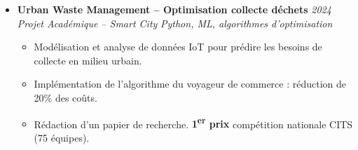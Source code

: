 \documentclass[a4paper,11pt]{article}
\begin{document}
\begin{itemize}[leftmargin=*, label={-}]
\item \textbf{Urban Waste Management -- Optimisation collecte déchets} \hfill \textit{2024} \\
\textit{Projet Académique -- Smart City} \hfill \textit{Python, ML, algorithmes d'optimisation}
\vspace{-2pt}
    \begin{itemize}[leftmargin=0.4cm, nosep, label=\tiny$\bullet$]
        \item \small{Modélisation et analyse de données IoT pour prédire les besoins de collecte en milieu urbain.}
        \item \small{Implémentation de l'algorithme du voyageur de commerce : réduction de 20\% des coûts.}
        \item \small{Rédaction d'un papier de recherche. \textbf{1\textsuperscript{er} prix} compétition nationale CITS (75 équipes).}
    \end{itemize}
\vspace{3pt}

\end{itemize}

\end{document}
